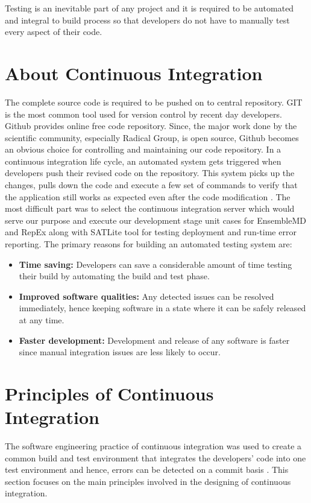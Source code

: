 \documentclass[10pt]{ruthesis}
\begin{document}
Testing is an inevitable part of any project and it is required to be automated and integral to build process so that developers do not have to manually test every aspect of their code. 

\section{About Continuous Integration}
The complete source code is required to be pushed on to central repository. GIT is the most common tool used for version control by recent day developers. Github provides online free code repository. Since, the major work done by the scientific community, especially Radical Group, is open source, Github becomes an obvious choice for controlling and maintaining our code repository. In a continuous integration life cycle, an automated system gets triggered when developers push their revised code on the repository. This system picks up the changes, pulls down the code and execute a few set of commands to verify that the application still works as expected even after the code modification \cite{ref17}. The most difficult part was to select the continuous integration server which would serve our purpose and execute our development stage unit cases for EnsembleMD and RepEx along with SATLite tool for testing deployment and run-time error reporting. The primary reasons for building an automated testing system are: 

\begin{itemize}
\item \textbf{Time saving:} Developers can save a considerable amount of time testing their build by automating the build and test phase.

\item \textbf{Improved software qualities:} Any detected issues can be resolved immediately, hence keeping software in a state where it can be safely released at any time.

\item \textbf{Faster development:} Development and release of any software is faster since manual integration issues are less likely to occur.
\end{itemize}


\section{Principles of Continuous Integration}

The software engineering practice of continuous integration was used to create a common build and test environment that integrates the developers’ code into one test environment and hence, errors can be detected on a commit basis \cite{ref26}. This section focuses on the main principles involved in the designing of continuous integration.
\end{document}

